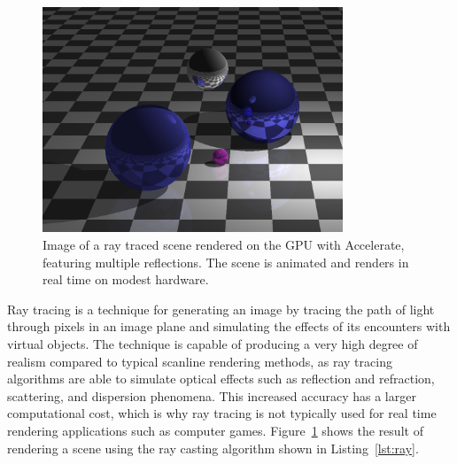 \begin{figure}
    \centering
    \includegraphics[width=0.8\textwidth]{images/results/ray/ray_sample}
    \caption[Ray tracer]{Image of a ray traced scene rendered on the GPU with
    Accelerate, featuring multiple reflections. The scene is animated and
    renders in real time on modest hardware.}
    \label{fig:ray_sample}
\end{figure}

Ray tracing is a technique for generating an image by tracing the path of light
through pixels in an image plane and simulating the effects of its encounters
with virtual objects. The technique is capable of producing a very high degree
of realism compared to typical scanline rendering methods, as ray tracing
algorithms are able to simulate optical effects such as reflection and
refraction, scattering, and dispersion phenomena. This increased accuracy has a
larger computational cost, which is why ray tracing is not typically used for
real time rendering applications such as computer games.
Figure~\ref{fig:ray_sample} shows the result of rendering a scene using the ray
casting algorithm shown in Listing~\ref{lst:ray}.

